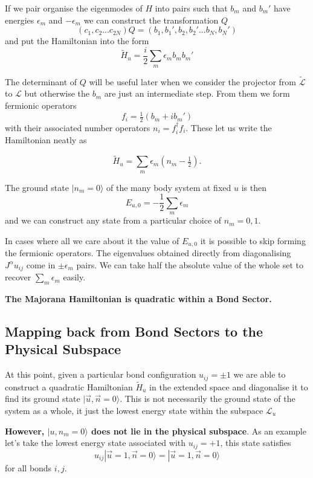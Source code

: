 If we pair organise the eigenmodes of \(H\) into pairs such that \(b_m\)
and \(b_m'\) have energies \(\epsilon_m\) and \(-\epsilon_m\) we can
construct the transformation \(Q\)
\[(c_1, c_2... c_{2N}) Q = (b_1, b_1', b_2, b_2' ... b_{N}, b_{N}')\]
and put the Hamiltonian into the form
\[\tilde{H}_u = \frac{i}{2} \sum_m \epsilon_m b_m b_m'\]

The determinant of \(Q\) will be useful later when we consider the
projector from \(\mathcal{\tilde{L}}\) to \(\mathcal{L}\) but otherwise
the \(b_m\) are just an intermediate step. From them we form fermionic
operators \[ f_i = \tfrac{1}{2} (b_m + ib_m')\] with their associated
number operators \(n_i = f^\dagger_i f_i\). These let us write the
Hamiltonian neatly as

\[ \tilde{H}_u = \sum_m \epsilon_m (n_m - \tfrac{1}{2}).\]

The ground state \(|n_m = 0\rangle\) of the many body system at fixed
\(u\) is then \[E_{u,0} = -\frac{1}{2}\sum_m \epsilon_m \] and we can
construct any state from a particular choice of \(n_m = 0,1\).

In cases where all we care about it the value of \(E_{u,0}\) it is
possible to skip forming the fermionic operators. The eigenvalues
obtained directly from diagonalising \(J^{\alpha} u_{ij}\) come in
\(\pm \epsilon_m\) pairs. We can take half the absolute value of the
whole set to recover \(\sum_m \epsilon_m\) easily.

\textbf{The Majorana Hamiltonian is quadratic within a Bond Sector.}

\hypertarget{mapping-back-from-bond-sectors-to-the-physical-subspace}{%
\subsection{Mapping back from Bond Sectors to the Physical
Subspace}\label{mapping-back-from-bond-sectors-to-the-physical-subspace}}

At this point, given a particular bond configuration \(u_{ij} = \pm 1\)
we are able to construct a quadratic Hamiltonian \(\tilde{H}_u\) in the
extended space and diagonalise it to find its ground state
\(|\vec{u}, \vec{n} = 0\rangle\). This is not necessarily the ground
state of the system as a whole, it just the lowest energy state within
the subspace \(\mathcal{L}_u\)

\textbf{However, \(|u, n_m = 0\rangle\) does not lie in the physical
subspace}. As an example let's take the lowest energy state associated
with \(u_{ij} = +1\), this state satisfies
\[u_{ij} |\vec{u}=1, \vec{n} = 0\rangle = |\vec{u}=1, \vec{n} = 0\rangle\]
for all bonds \(i,j\).

